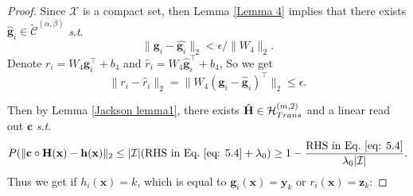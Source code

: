 \documentclass[10pt,a4paper]{amsart}
\begin{document}
\begin{proof}
    Since $\mathcal{X}$ is a compact set, then Lemma \ref{Lemma 4} implies that there exists $\hat{\mathbf{g}}_i \in \widetilde{\mathcal{C}}^{(\alpha, \beta)}$ \textit{s}.\textit{t}.
    \begin{equation}
        \|\mathbf{g}_i - \hat{\mathbf{g}_i}\|_2 < \epsilon / \|W_4\|_2.
    \end{equation}
    Denote $r_i = W_4\mathbf{g}_i^{\top}+b_4$ and $\hat{r}_i = W_4\hat{\mathbf{g}}_i^{\top}+b_4$,
    So we get
    \begin{equation}
       \|r_i -\hat{r}_i \|_2=\|W_4(\mathbf{g}_i-\hat{\mathbf{g}}_i)^{\top}\|_2\leq \epsilon.
    \end{equation}
    
    Then by Lemma \ref{Jackson lemma1}, there exists $\hat{\mathbf{H}} \in \mathcal{H}_{\rm Trans}^{(m,2)}$ and a linear read out $\mathbf{c}$ \textit{s}.\textit{t}. 
   \begin{equation}   
    P(\|\mathbf{c}\circ\mathbf{H}(\mathbf{x})-\mathbf{h}(\mathbf{x})\|_2\leq|\mathcal{I}|(\text{RHS~in~Eq.}~\eqref{eq: 5.4}+\lambda_0)\geq 1 - \frac{\text{RHS~in~Eq.}~\eqref{eq: 5.4}}{\lambda_0|\mathcal{I}|}.
    \label{eq: 5.6}
    \end{equation}
    Thus we get if $h_i(\mathbf{x})=k$, which is equal to $\mathbf{g}_i(\mathbf{x})=\mathbf{y}_k$ or $r_i(\mathbf{x})=\mathbf{z}_k$:
    

\end{proof}
\end{document}
